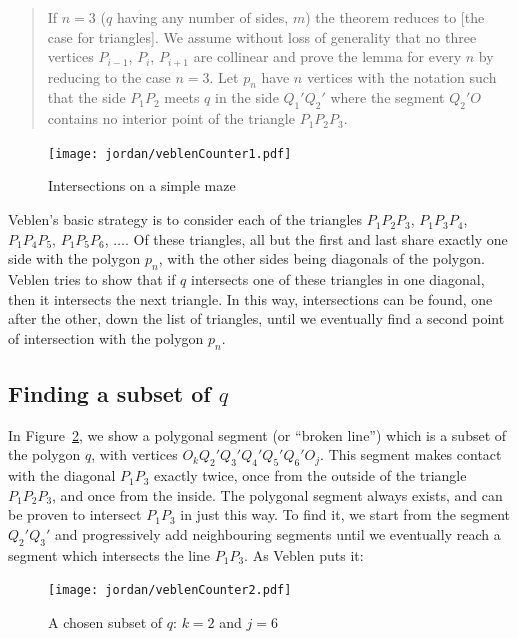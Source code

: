 \begin{quote}
If $n=3$ ($q$ having any number of sides, $m$) the theorem reduces to [the case for triangles]. We assume without loss of generality that no three vertices $P_{i-1}$, $P_i$, $P_{i+1}$ are collinear and prove the lemma for every $n$ by reducing to the case $n=3$. Let $p_n$ have $n$ vertices with the notation such that the side $P_1P_2$ meets $q$ in the side $Q_1'Q_2'$ where the segment $Q_2'O$ contains no interior point of the triangle $P_1P_2P_3$.\end{quote}

\begin{figure}
\centering
\texttt{[image: jordan/veblenCounter1.pdf]}
\caption{Intersections on a simple maze}
\label{fig:VeblenCounter1}
\end{figure}

Veblen's basic strategy is to consider each of the triangles $P_1P_2P_3$, $P_1P_3P_4$, $P_1P_4P_5$, $P_1P_5P_6$, $\ldots$. Of these triangles, all but the first and last share exactly one side with the polygon $p_n$, with the other sides being diagonals of the polygon. Veblen tries to show that if $q$ intersects one of these triangles in one diagonal, then it intersects the next triangle. In this way, intersections can be found, one after the other, down the list of triangles, until we eventually find a second point of intersection with the polygon $p_n$.

\subsection{Finding a subset of $q$}\label{sec:SubsetOfQ}
In Figure~\ref{fig:VeblenCounter2}, we show a polygonal segment  (or ``broken line'') which is a subset of the polygon $q$, with vertices $O_kQ_2'Q_3'Q_4'Q_5'Q_6'O_j$. This segment makes contact with the diagonal $P_1P_3$ exactly twice, once from the outside of the triangle $P_1P_2P_3$, and once from the inside. The polygonal segment always exists, and can be proven to intersect $P_1P_3$ in just this way. To find it, we start from the segment $Q_2'Q_3'$ and progressively add neighbouring segments until we eventually reach a segment which intersects the line $P_1P_3$. As Veblen puts it:

\begin{figure}
\centering
\texttt{[image: jordan/veblenCounter2.pdf]}
\caption{A chosen subset of $q$: $k=2$ and $j=6$}
\label{fig:VeblenCounter2}
\end{figure}

